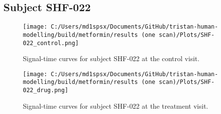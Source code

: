 \documentclass{epflreport}%
\begin{document}
\subsection{Subject SHF{-}022}%
\label{subsec:SubjectSHF{-}022}%

%


\begin{figure}[h!]%
\centering%
\texttt{[image: C:/Users/md1spsx/Documents/GitHub/tristan-human-modelling/build/metformin/results (one scan)/Plots/SHF-022\_control.png]}%
\caption{Signal{-}time curves for subject SHF{-}022 at the control visit.}%
\end{figure}

%


\begin{figure}[h!]%
\centering%
\texttt{[image: C:/Users/md1spsx/Documents/GitHub/tristan-human-modelling/build/metformin/results (one scan)/Plots/SHF-022\_drug.png]}%
\caption{Signal{-}time curves for subject SHF{-}022 at the treatment visit.}%
\end{figure}
\end{document}
